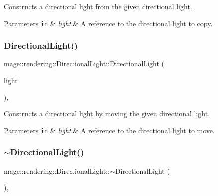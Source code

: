Constructs a directional light from the given directional light.


\begin{DoxyParams}[1]{Parameters}
\mbox{\tt in}  & {\em light} & A reference to the directional light to copy. \\
\hline
\end{DoxyParams}
\mbox{\label{classmage_1_1rendering_1_1_directional_light_aa8ff1e6487160eb851cc2c393be9ab6a}} 
\subsubsection{\texorpdfstring{Directional\+Light()}{DirectionalLight()}\hspace{0.1cm}{\footnotesize\ttfamily [3/3]}}
{\footnotesize\ttfamily mage\+::rendering\+::\+Directional\+Light\+::\+Directional\+Light (\begin{DoxyParamCaption}\item[{\mbox{\hyperlink{classmage_1_1rendering_1_1_directional_light}{Directional\+Light}} \&\&}]{light }\end{DoxyParamCaption})\hspace{0.3cm}{\ttfamily [default]}, {\ttfamily [noexcept]}}

Constructs a directional light by moving the given directional light.


\begin{DoxyParams}[1]{Parameters}
\mbox{\tt in}  & {\em light} & A reference to the directional light to move. \\
\hline
\end{DoxyParams}
\mbox{\label{classmage_1_1rendering_1_1_directional_light_a0f35f25f86aeb2ae688a8918fa3d8b76}} 
\subsubsection{\texorpdfstring{$\sim$\+Directional\+Light()}{~DirectionalLight()}}
{\footnotesize\ttfamily mage\+::rendering\+::\+Directional\+Light\+::$\sim$\+Directional\+Light (\begin{DoxyParamCaption}{ }\end{DoxyParamCaption})\hspace{0.3cm}{\ttfamily [virtual]}, {\ttfamily [default]}}

